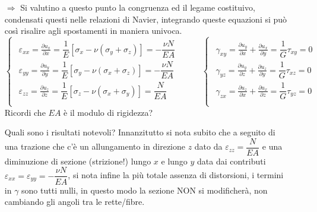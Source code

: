 \begin{itemize}
	 	
 \item[$\Rightarrow$] Si valutino a questo punto la congruenza ed il legame costituivo, condensati questi nelle relazioni di Navier, integrando queste equazioni si può così risalire agli spostamenti in maniera univoca.
 	\[ 
 \begin{cases}
 	\begin{aligned}
 		\varepsilon_{xx} =   \frac{\partial u_x}{\partial x} = \dfrac{1}{E}[\sigma_x - \nu(\sigma_y + \sigma_z)] = -\dfrac{\nu N}{EA} \\
 		\varepsilon_{yy} =   \frac{\partial u_y}{\partial y} = \dfrac{1}{E}[\sigma_y - \nu(\sigma_x + \sigma_z)] = -\dfrac{\nu N}{EA} \\
 		\varepsilon_{zz} =   \frac{\partial u_z}{\partial z} = \dfrac{1}{E}[\sigma_z - \nu(\sigma_x + \sigma_y)] = \dfrac{ N}{EA} \\
 	\end{aligned}
 \end{cases} \hspace{1cm} \begin{cases}
 	\begin{aligned}
 		\gamma_{xy} =   \frac{\partial u_y}{\partial x} + \frac{\partial u_x}{\partial y} = \dfrac{1}{G} \tau_{xy} = 0\\
 		\gamma_{yz} =   \frac{\partial u_y}{\partial z} + \frac{\partial u_z}{\partial y} = \dfrac{1}{G} \tau_{xz} = 0 \\
 		\gamma_{zx} =   \frac{\partial u_z}{\partial x} + \frac{\partial u_x}{\partial z} = \dfrac{1}{G} \tau_{yz} = 0 \\
 	\end{aligned}
 \end{cases}
 \]
 	Ricordi che $EA$ è il modulo di rigidezza? \newline 
 	
 	 Quali sono i risultati notevoli? Innanzitutto si nota subito che a seguito di una trazione che c'è un allungamento in direzione $z$ dato da $\varepsilon_{zz} = \dfrac{ N}{EA}$ e una diminuzione di sezione (strizione!) lungo $ x $ e lungo $ y $ data dai contributi $\varepsilon_{xx} = \varepsilon_{yy} = -\dfrac{\nu N}{EA}$, si nota infine  la più totale assenza di distorsioni, i termini in $\gamma$ sono tutti nulli, in questo modo la sezione NON si modificherà, non cambiando gli angoli tra le rette/fibre. 
 	

\end{itemize}
